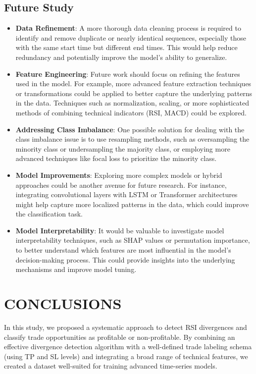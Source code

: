 \documentclass[letterpaper, 10 pt, conference]{ieeeconf}  %
\begin{document}
\subsection{Future Study}
\begin{itemize}
    \item \textbf{Data Refinement}: A more thorough data cleaning process is required to identify and remove duplicate or nearly identical sequences, especially those with the same start time but different end times. This would help reduce redundancy and potentially improve the model’s ability to generalize.
    \item \textbf{Feature Engineering}: Future work should focus on refining the features used in the model. For example, more advanced feature extraction techniques or transformations could be applied to better capture the underlying patterns in the data. Techniques such as normalization, scaling, or more sophisticated methods of combining technical indicators (RSI, MACD) could be explored.
    \item \textbf{Addressing Class Imbalance}: One possible solution for dealing with the class imbalance issue is to use resampling methods, such as oversampling the minority class or undersampling the majority class, or employing more advanced techniques like focal loss to prioritize the minority class.
    \item \textbf{Model Improvements}: Exploring more complex models or hybrid approaches could be another avenue for future research. For instance, integrating convolutional layers with LSTM or Transformer architectures might help capture more localized patterns in the data, which could improve the classification task.
    \item \textbf{Model Interpretability}: It would be valuable to investigate model interpretability techniques, such as SHAP values or permutation importance, to better understand which features are most influential in the model’s decision-making process. This could provide insights into the underlying mechanisms and improve model tuning.
\end{itemize}

\section{CONCLUSIONS}

In this study, we proposed a systematic approach to detect RSI divergences and classify trade opportunities as profitable or non-profitable. By combining an effective divergence detection algorithm with a well-defined trade labeling schema (using TP and SL levels) and integrating a broad range of technical features, we created a dataset well-suited for training advanced time-series models.
\end{document}
